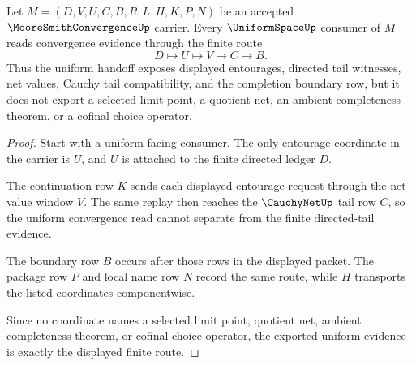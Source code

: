 \begin{theorem}
\label{thm:moore-smith-convergence-uniform-handoff}
Let $M=(D,V,U,C,B,R,L,H,K,P,N)$ be an accepted $\MooreSmithConvergenceUp$ carrier. Every $\UniformSpaceUp$ consumer of $M$ reads convergence evidence through the finite route
$$
D \longmapsto U \longmapsto V \longmapsto C \longmapsto B .
$$
Thus the uniform handoff exposes displayed entourages, directed tail witnesses, net values, Cauchy tail compatibility, and the completion boundary row, but it does not export a selected limit point, a quotient net, an ambient completeness theorem, or a cofinal choice operator.
\end{theorem}
\begin{proof}
Start with a uniform-facing consumer. The only entourage coordinate in the carrier is $U$, and $U$ is attached to the finite directed ledger $D$.

The continuation row $K$ sends each displayed entourage request through the net-value window $V$. The same replay then reaches the $\CauchyNetUp$ tail row $C$, so the uniform convergence read cannot separate from the finite directed-tail evidence.

The boundary row $B$ occurs after those rows in the displayed packet. The package row $P$ and local name row $N$ record the same route, while $H$ transports the listed coordinates componentwise.

Since no coordinate names a selected limit point, quotient net, ambient completeness theorem, or cofinal choice operator, the exported uniform evidence is exactly the displayed finite route.
\end{proof}

